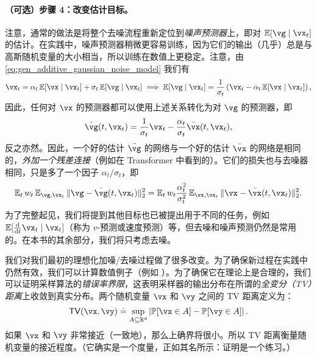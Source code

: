 \documentclass[../../book-main.tex]{subfiles}
\begin{document}
\paragraph{（可选）步骤 4：改变估计目标。} 注意，通常的做法是将整个去噪流程重新定位到\textit{噪声预测器}上，即对 \(\Ex[\vg \mid \vx_{t}]\) 的估计。在实践中，噪声预测器稍微更容易训练，因为它们的输出（几乎）总是与高斯随机变量的大小相当，所以训练在数值上更稳定。注意，由 \eqref{eq:gen_additive_gaussian_noise_model} 我们有
\begin{equation}
	\vx_{t} = \alpha_{t}\Ex[\vx \mid \vx_{t}] + \sigma_{t}\Ex[\vg \mid \vx_{t}] \implies \Ex[\vg \mid \vx_{t}] = \frac{1}{\sigma_{t}}\bp{\vx_{t} - \alpha_{t}\Ex[\vx \mid \vx_{t}]},
\end{equation}
因此，任何对 \(\vx\) 的预测器都可以使用上述关系转化为对 \(\vg\) 的预测器，即
\begin{equation}
	\bar{\vg}(t, \vx_{t}) = \frac{1}{\sigma_{t}}\vx_{t} - \frac{\alpha_{t}}{\sigma_{t}}\bar{\vx}(t, \vx_{t}),
\end{equation}
反之亦然。因此，一个好的估计 \(\bar{\vg}\) 的网络与一个好的估计 \(\bar{\vx}\) 的网络是相同的，\textit{外加一个残差连接}（例如在 Transformer 中看到的）。它们的损失也与去噪器相同，只是多了一个因子 \(\alpha_{t}/\sigma_{t}\)，即
\begin{equation}
	\Ex_{t}w_{t}\Ex_{\vg, \vx_{t}}\norm{\vg - \bar{\vg}(t, \vx_{t})}_{2}^{2} = \Ex_{t}w_{t}\frac{\alpha_{t}^{2}}{\sigma_{t}^{2}}\Ex_{\vx, \vx_{t}}\norm{\vx - \bar{\vx}(t, \vx_{t})}_{2}^{2}.
\end{equation}
为了完整起见，我们将提到其他目标也已被提出用于不同的任务，例如 \(\Ex[\odv*{\vx_{t}}{t} \mid \vx_{t}]\)（称为 \(v\)-预测或速度预测）等，但去噪和噪声预测仍然是常用的。在本书的其余部分，我们将只考虑去噪。


我们对我们最初的理想化加噪/去噪过程做了很多改变。为了确保新过程在实践中仍然有效，我们可以计算数值例子（例如 ）。为了确保它在理论上是合理的，我们可以证明采样算法的\textit{错误率界限}，这表明采样器的输出分布在所谓的\textit{全变分（TV）距离}上收敛到真实分布。两个随机变量 \(\vx\) 和 \(\vy\) 之间的 TV 距离定义为：
\begin{equation}
	\TV(\vx, \vy) \doteq \sup_{A \subseteq \R^{d}}\abs*{\Pr[\vx \in A] - \Pr[\vy \in A]}.
\end{equation}
如果 \(\vx\) 和 \(\vy\) 非常接近（一致地），那么上确界将很小。所以 TV 距离衡量随机变量的接近程度。（它确实是一个度量，正如其名所示：证明是一个练习。）
\end{document}
